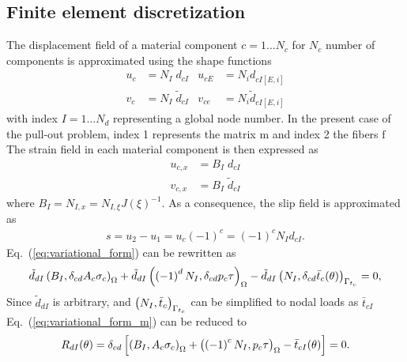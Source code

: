 \documentclass[main.tex]{subfiles}
\begin{document}
\subsection{Finite element discretization}

The displacement field of a material component $c = 1 \ldots N_c$ for $N_c$ number of components is approximated using the shape functions
\begin{align}
 \label{eq:u_c_ansatz}
\nonumber
 u_c &= N_{I} \; d_{cI} & u_{cE} &= N_{i} d_{cI[E,i]} \\
 v_c &= N_{I} \; \tilde{d}_{cI} & v_{ce} &= N_{i} \tilde{d}_{cI[E,i]}
\end{align}
with index $I = 1 \ldots N_d$ representing a global node number. 
In the present case of the pull-out problem, index 1 represents the matrix $\mathrm{m}$ and index 2 the fibers $\mathrm{f}$  
The strain field in each material component is then expressed as
\begin{align}
 u_{c,x} &= B_{I} \; d_{cI} \\
 v_{c,x} &= B_{I} \; \tilde{d}_{cI}
\end{align}
where $B_{I} = N_{I,x} = N_{I,\xi} J(\xi)^{-1}$. As a consequence, the slip field is approximated 
as
\begin{align}
 s = u_2 - u_1 = u_c \left(-1\right)^c = \left(-1\right)^c N_I d_{cI}.
\end{align}
Eq.~(\ref{eq:variational_form}) can be rewritten as
\begin{equation}
\label{eq:variational_form_m}
\tilde{d}_{dI} \left( B_{I}, \delta_{cd} A_c \sigma_c \right)_\Omega +
\tilde{d}_{dI} \left(   \left(-1\right)^{d} N_I , \delta_{cd} p_c\tau \right)_\Omega -
\tilde{d}_{dI} \left( N_{I},  \delta_{cd} \bar{t}_{c}(\theta) \right)_{\Gamma_{{t_{c}}}} = 0, 
\end{equation}
Since $\tilde{d}_{dI}$ is arbitrary, and  $\left( N_{I},  \bar{t}_{c} \right)_{\Gamma_{{t_{c}}}}$
can be simplified to nodal loads as $\bar{t}_{cI}$
Eq.~(\ref{eq:variational_form_m}) can be reduced to 
\begin{equation}
\label{eq:residual}
R_{dI}(\theta)  = \delta_{cd}
\left[
\left( B_{I},  A_c \sigma_c \right)_\Omega + 
\left(  \left(-1\right)^{c} N_I , p_c\tau \right)_\Omega -
\bar{t}_{cI}(\theta) 
\right] =
0.
\end{equation}
\end{document}
